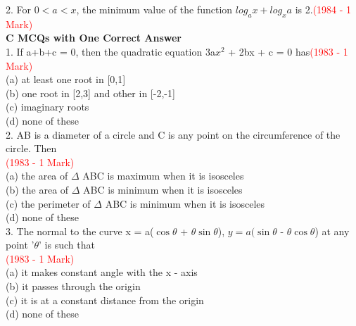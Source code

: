 \documentclass[journal,12pt,twocolumn]{IEEEtran}
\theoremstyle{remark}
\begin{document}
2.  For $0 < a < x$, the minimum value of the function \indent $log_a x + log_x a$ is 2.\hspace{2.3cm}\textcolor{red}{(1984 - 1 Mark)}\\[6pt]
\indent\hspace{0.3cm}\textbf{C MCQs with One Correct Answer}\\[6pt]
1.  If a+b+c = 0, then the quadratic equation 3a$x^2$ \indent + 2bx + c = 0 has\hspace{2.2cm}\textcolor{red}{(1983 - 1 Mark)}\\[2pt]\indent (a)\hspace{0.2cm} at least one root in [0,1]\\[2pt]\indent (b)\hspace{0.2cm} one root in [2,3] and other in [-2,-1]\\[2pt]\indent (c)\hspace{0.2cm} imaginary roots\\[2pt]\indent (d)\hspace{0.2cm} none of these\\[3pt]
2.  AB is a diameter of a circle and C is any point \indent on the circumference of the circle. Then\\[2pt]\indent\hspace{5.4cm} \textcolor{red}{(1983 - 1 Mark)}\\[2pt]\indent (a)\hspace{0.2cm} the area of $\Delta$ ABC is maximum when it is \indent \indent \indent isosceles\\[2pt]\indent (b)\hspace{0.2cm} the area of $\Delta$ ABC is minimum when it is \indent \indent \indent isosceles\\[2pt]\indent (c)\hspace{0.2cm} the perimeter of $\Delta$ ABC is minimum when \indent \indent \indent it is isosceles\\[2pt]\indent (d)\hspace{0.2cm} none of these\\[3pt]
3.  The normal to the curve x = a($\cos \theta$ + $\theta\sin \theta$), \indent $y = a(\sin \theta$ - $\theta\cos \theta$) at any point '$\theta$' is such that\\[2pt]\indent\hspace{5.4cm} \textcolor{red}{(1983 - 1 Mark)}\\[2pt]\indent (a)\hspace{0.2cm} it makes  constant angle with the x - axis\\[2pt]\indent (b)\hspace{0,2cm} it passes through the origin\\[2pt]\indent (c)\hspace{0.2cm} it is at a constant distance from the origin\\[2pt]\indent (d)\hspace{0.2cm} none of these\\[3pt]
\end{document}
